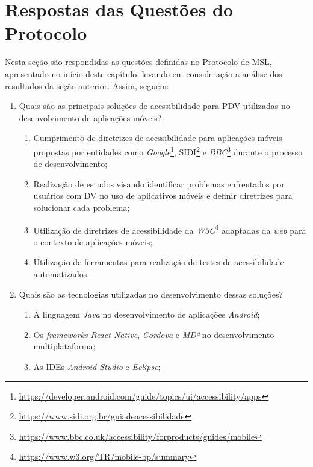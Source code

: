 \newpage

\section{Respostas das Questões do Protocolo}

Nesta seção são respondidas as questões definidas no Protocolo de MSL, apresentado no início deste capítulo, levando em consideração a análise dos resultados da seção anterior.
Assim, seguem:

\begin{enumerate}
    \item Quais são as principais soluções de acessibilidade para PDV utilizadas
          no desenvolvimento de aplicações móveis?
          \begin{enumerate}
              \item Cumprimento de diretrizes de acessibilidade para aplicações móveis propostas por entidades
                    como \emph{Google}\footnote{\url{https://developer.android.com/guide/topics/ui/accessibility/apps}},
                    SIDI\footnote{\url{https://www.sidi.org.br/guiadeacessibilidade}} e
                    \emph{BBC}\footnote{\url{https://www.bbc.co.uk/accessibility/forproducts/guides/mobile}}
                    durante o processo de desenvolvimento;
              \item Realização de estudos visando identificar problemas enfrentados por usuários com DV no uso de aplicativos móveis e definir diretrizes para solucionar cada problema;
              \item Utilização de diretrizes de acessibilidade da \emph{W3C}\footnote{\url{https://www.w3.org/TR/mobile-bp/summary}} adaptadas da \emph{web} para o contexto de aplicações móveis;
              \item Utilização de ferramentas para realização de testes de acessibilidade automatizados.
          \end{enumerate}
    \item Quais são as tecnologias utilizadas no desenvolvimento dessas soluções?
          \begin{enumerate}
              \item A linguagem \emph{Java} no desenvolvimento de aplicações \emph{Android};
              \item Os \emph{frameworks} \emph{React Native}, \emph{Cordova} e \emph{MD²} no desenvolvimento multiplataforma;
              \item As IDEs \emph{Android Studio} e \emph{Eclipse};

\end{enumerate}
\end{enumerate}
